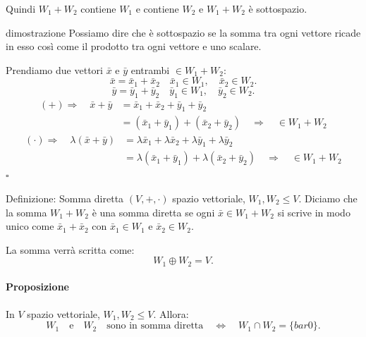 \documentclass[x11names]{article}
\newcommand*{\QEDB}{\null\nobreak\hfill\ensuremath{\square}}%
\begin{document}
Quindi $W_1 + W_2$ contiene $W_1$ e contiene $W_2$ e $W_1 + W_2$ è sottospazio.
\begin{es}{dimostrazione}
Possiamo dire che è sottospazio se la somma tra ogni vettore ricade in esso così come il prodotto tra ogni vettore e uno scalare.

Prendiamo due vettori $\bar{x}$ e $\bar{y}$ entrambi $\in W_1 + W_2$:
\[
\bar{x} = \bar{x}_{1} + \bar{x}_{2} \quad \bar{x}_1 \in W_1, \quad \bar{x}_{2} \in W_2
.\] 
\[
\bar{y} = \bar{y}_{1} + \bar{y}_{2} \quad \bar{y}_1 \in W_1, \quad \bar{y}_{2} \in W_2
.\] 
\begin{align*}
	\left(+\right)\Rightarrow \quad \bar{x} + \bar{y} &= \bar{x}_{1} + \bar{x}_{2} + \bar{y}_{1} + \bar{y}_{2} \\
						      &= \left(\bar{x}_{1} + \bar{y}_{1}\right) + \left(\bar{x}_{2}+\bar{y}_{2}\right) \quad \Rightarrow \quad \in W_1 + W_2 
\end{align*}
\begin{align*}
	\left(\cdot\right) \Rightarrow \quad \lambda\left(\bar{x}+\bar{y}\right) &= \lambda \bar{x}_{1} + \lambda \bar{x}_{2} + \lambda \bar{y}_{1} + \lambda \bar{y}_{2} \\
						      &= \lambda\left(\bar{x}_{1} + \bar{y}_{1}\right) + \lambda\left(\bar{x}_{2}+\bar{y}_{2}\right) \quad \Rightarrow \quad \in W_1 + W_2
\end{align*}  \QEDB
\end{es}


\begin{center}
\colorbox{myblue}{\begin{minipage}{5.75in}
\begin{blues}{Definizione: Somma diretta}
$\left(V,+,\cdot\right)$ spazio vettoriale, $W_1,W_2 \leq V$. Diciamo che la somma $W_1+W_2$ è una somma diretta se ogni $\bar{x} \in W_1+W_2$ si scrive in modo unico come $\bar{x}_1 + \bar{x}_2$ con $\bar{x}_1 \in W_1$ e $\bar{x}_2 \in W_2 $.

La somma verrà scritta come:
\[
W_1 \oplus W_2 = V
.\] 
\end{blues}
\end{minipage}}        
\end{center}

\paragraph{Proposizione}
In $V$ spazio vettoriale, $W_1,W_2 \leq V$. Allora:
\[
W_1 \quad \text{e} \quad W_2 \quad \text{sono in somma diretta} \quad \Longleftrightarrow \quad W_1 \cap W_2 = \{bar{0}\} 
.\] 
\end{document}
